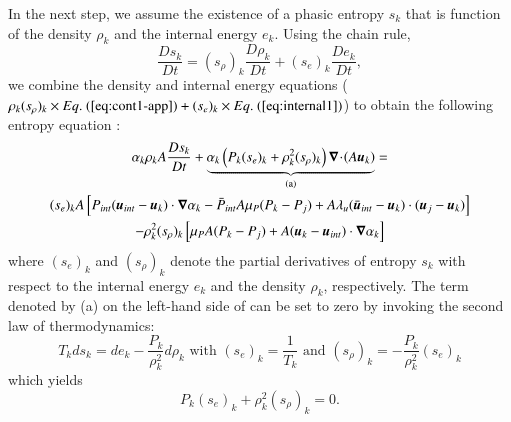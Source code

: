 \documentclass[preprint,10pt]{elsarticle}
\begin{document}
{\begin{appendices}
In the next step, we assume the existence of a phasic entropy $s_k$ that is function of the density $\rho_k$ and the  internal energy $e_k$. Using the chain rule, 
\begin{equation}
\frac{Ds_k}{Dt} = (s_\rho)_k \frac{D \rho_k}{Dt} + (s_e)_k \frac{De_k}{Dt},
\end{equation}
we combine the density and internal energy equations ($\rho_k (s_\rho)_k \times \eqt{eq:cont1-app}  + (s_e)_k \times \eqt{eq:internal1}$) to obtain  the following entropy equation :
\begin{multline}
\label{eq:ent1}
\alpha_k \rho_k A \frac{Ds_k}{Dt} + 
\underbrace{\alpha_k \left( P_k (s_e)_k + \rho_k^2 (s_\rho)_k \right)  \boldsymbol\nabla\! \cdot \! \left( A \boldsymbol u_k \right) }_\textrm{(a)} = \\
(s_e)_k A \left[ P_{int}(\boldsymbol u_{int}-\boldsymbol u_k)\cdot \boldsymbol\nabla \alpha_k - \bar{P}_{int} A \mu_P (P_k-P_j) + A \lambda_u (\bar{\boldsymbol u}_{int}-\boldsymbol u_k) \cdot (\boldsymbol u_j-\boldsymbol u_k)\right] \\
- \rho_k^2 (s_\rho)_k \left[ \mu_P A (P_k-P_j) + A(\boldsymbol u_k-\boldsymbol u_{int}) \cdot \boldsymbol\nabla \alpha_k\right] 
\end{multline}
where $(s_e)_k$ and $(s_\rho)_k$ denote the partial derivatives of entropy $s_k$ with respect to the internal energy $e_k$ and the density $\rho_k$, respectively.
The term denoted by (a) on the left-hand side of  can be set to zero by invoking the second law of thermodynamics:
\begin{equation}
T_k ds_k = de_k - \frac{P_k}{\rho_k^2} d \rho_k \text{ with } (s_e)_k = \frac{1}{T_k} \text{ and } (s_\rho)_k = - \frac{P_k}{\rho_k^2} (s_e)_k
\end{equation}
which yields
\begin{equation}
\label{eq:ent2}
 P_k (s_e)_k + \rho_k^2 (s_\rho)_k = 0 .
\end{equation} 


\end{appendices}}
\end{document}
